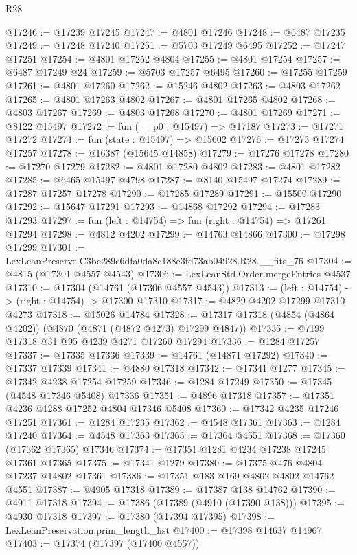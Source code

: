\begin{lexlean}{R28}
\begin{coremodule}
@17246 := @17239 @17245
@17247 := @4801 @17246
@17248 := @6487 @17235
@17249 := @17248 @17240
@17251 := @5703 @17249 @6495
@17252 := @17247 @17251
@17254 := @4801 @17252 @4804
@17255 := @4801 @17254
@17257 := @6487 @17249 @24
@17259 := @5703 @17257 @6495
@17260 := @17255 @17259
@17261 := @4801 @17260
@17262 := @15246 @4802
@17263 := @4803 @17262
@17265 := @4801 @17263 @4802
@17267 := @4801 @17265 @4802
@17268 := @4803 @17267
@17269 := @4803 @17268
@17270 := @4801 @17269
@17271 := @8122 @15497
@17272 := fun (__p0 : @15497) => @17187
@17273 := @17271 @17272
@17274 := fun (state : @15497) => @15602
@17276 := @17273 @17274 @17257
@17278 := @16387 (@15645 @14858)
@17279 := @17276 @17278
@17280 := @17270 @17279
@17282 := @4801 @17280 @4802
@17283 := @4801 @17282
@17285 := @6465 @15497 @4798
@17287 := @8140 @15497 @17274
@17289 := @17287 @17257 @17278
@17290 := @17285 @17289
@17291 := @15509 @17290
@17292 := @15647 @17291
@17293 := @14868 @17292
@17294 := @17283 @17293
@17297 := fun (left : @14754) => fun (right : @14754) => @17261 @17294
@17298 := @4812 @4202
@17299 := @14763 @14866
@17300 := @17298 @17299
@17301 := LexLeanPreserve.C3be289e6dfa0da8c188e3fd73ab04928.R28.__fits_76
@17304 := @4815 (@17301 @4557 @4543)
@17306 := LexLeanStd.Order.mergeEntries @4537
@17310 := @17304 (@14761 (@17306 @4557 @4543))
@17313 := (left : @14754) -> (right : @14754) -> @17300 @17310
@17317 := @4829 @4202 @17299 @17310 @4273
@17318 := @15026 @14784
@17328 := @17317 @17318 (@4854 (@4864 @4202)) (@4870 (@4871 (@4872 @4273) @17299 @4847))
@17335 := @7199 @17318 @31 @95 @4239 @4271 @17260 @17294
@17336 := @1284 @17257
@17337 := @17335 @17336
@17339 := @14761 (@14871 @17292)
@17340 := @17337 @17339
@17341 := @4880 @17318
@17342 := @17341 @1277
@17345 := @17342 @4238 @17254 @17259
@17346 := @1284 @17249
@17350 := @17345 (@4548 @17346 @5408) @17336
@17351 := @4896 @17318
@17357 := @17351 @4236 @1288 @17252 @4804 @17346 @5408
@17360 := @17342 @4235 @17246 @17251
@17361 := @1284 @17235
@17362 := @4548 @17361
@17363 := @1284 @17240
@17364 := @4548 @17363
@17365 := @17364 @4551
@17368 := @17360 (@17362 @17365) @17346
@17374 := @17351 @1281 @4234 @17238 @17245 @17361 @17365
@17375 := @17341 @1279
@17380 := @17375 @476 @4804 @17237 @14802 @17361
@17386 := @17351 @183 @169 @4802 @4802 @14762 @4551
@17387 := @4905 @17318
@17389 := @17387 @138 @14762
@17390 := @4911 @17318
@17394 := @17386 (@17389 (@4910 (@17390 @138)))
@17395 := @4930 @17318
@17397 := @17380 (@17394 @17395)
@17398 := LexLeanPreservation.prim_length_list
@17400 := @17398 @14637 @14967
@17403 := @17374 (@17397 (@17400 @4557))

\end{coremodule}
\end{lexlean}
